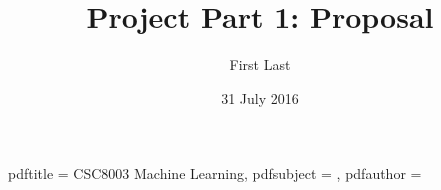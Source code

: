 \newcommand{\usqcoursecode}{CSC8003}
\newcommand{\usqcoursedescription}{Machine Learning}
\title{Project Part 1: Proposal}
\newcommand{\usqsubtitle}{}
\author{First Last}
\newcommand{\usqstudentnumber}{123456789}
\newcommand{\usqstudentemail}{a@b.c}
\newcommand{\usqacademicyear}{2016}
\newcommand{\usqacademicsemester}{2}
\date{31 July 2016}
\newcommand{\usqpreparedfor}{Mr A B}
\newcommand{\usqpreparedforposition}{Assistant examiner}
\newcommand{\usqpreparedfororganisation}{School of Agricultural, Computational and Environmental Sciences}
\makeatletter
\hypersetup
{
  pdftitle   =  \usqcoursecode{} \usqcoursedescription,
  pdfsubject = \@title,
  pdfauthor  = \@author
}
\makeatother